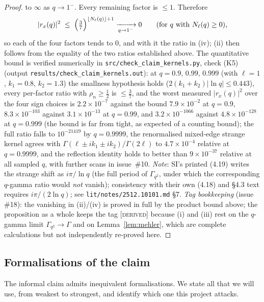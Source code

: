 \documentclass[11pt,a4paper]{article}
\newcommand{\DERIVED}{{\color{teal}\textsc{[derived]}}}
\theoremstyle{definition}
\theoremstyle{plain}
\begin{document}
\begin{proof}
to $\infty$ as $q\to1^{-}$. Every remaining factor is $\le1$. Therefore
\[
  |r_{x}(q)|^{2}\;\le\;\Bigl(\tfrac37\Bigr)^{\lfloor N_{\ell}(q)\rfloor+1}
  \xrightarrow[q\to1^{-}]{}0
  \qquad\text{(for $q$ with $N_{\ell}(q)\ge0$),}
\]
so each of the four factors tends to $0$, and with it the ratio in (iv); (ii) then follows
from the equality of the two ratios established above. The quantitative bound is verified
numerically in \texttt{src/check\_claim\_kernels.py}, check (K5) (output
\texttt{results/check\_claim\_kernels.out}): at $q=0.9,\,0.99,\,0.999$ (with $\ell=1$,
$k_{1}=0.8$, $k_{2}=1.3$) the smallness hypothesis holds ($2(k_1+k_2)|\ln q|\le0.443$),
every per-factor ratio with $\rho_{n}\ge\tfrac12$ is $\le\tfrac37$, and the worst measured
$|r_{x}(q)|^{2}$ over the four sign choices is $2.2\times10^{-7}$ against the bound
$7.9\times10^{-2}$ at $q=0.9$, $8.3\times10^{-103}$ against $3.1\times10^{-13}$ at
$q=0.99$, and $3.2\times10^{-1066}$ against $4.8\times10^{-128}$ at $q=0.999$ (the bound is
far from tight, as expected of a counting bound); the full ratio falls to
$10^{-21419}$ by $q=0.9999$, the renormalised mixed-edge strange kernel agrees
with $\Gamma(\ell\pm ik_1\pm ik_2)/\Gamma(2\ell)$ to $4.7\times10^{-4}$ relative at $q=0.9999$,
and the reflection identity holds to better than $9\times10^{-37}$ relative at all sampled $q$,
with further scans in issue~\#10. \emph{Note}: SI's printed (4.19) writes the strange shift as
$i\pi/\ln q$ (the full period of
$\Gamma_{q^{2}}$, under which the corresponding $q$-gamma ratio would \emph{not} vanish);
consistency with their own (4.18) and \S4.3
text requires $i\pi/(2\ln q)$; see \texttt{lit/notes/2512.10101.md} \S7. \emph{Tag
bookkeeping} (issue \#18): the vanishing in (ii)/(iv) is proved in full by the product
bound above; the proposition as a whole keeps the tag \DERIVED{} because (i) and (iii) rest
on the $q$-gamma limit $\Gamma_{q^{2}}\to\Gamma$ and on Lemma~\ref{lem:mehler}, which are
complete calculations but not independently re-proved here.
\end{proof}

\subsection{Formalisations of the claim}
\label{sec:formalisations}

The informal claim admits inequivalent formalisations. We state all that we will use, from
weakest to strongest, and identify which one this project attacks.
\end{document}
